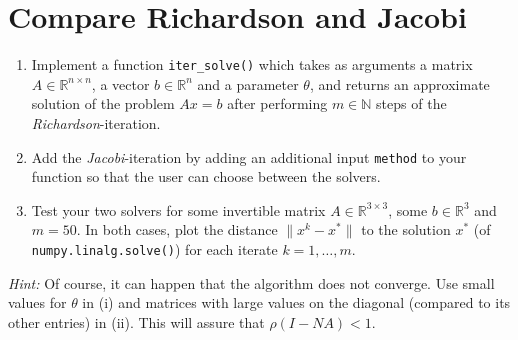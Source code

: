 \section{Compare Richardson and Jacobi}
\vspace{-0.5cm}
	\begin{enumerate}
		\item 	Implement a function \verb|iter_solve()| which takes as arguments a matrix $A \in \mathbb{R}^{n \times n}$, a vector $b \in \mathbb{R}^ {n}$ and a parameter $\theta$,
		and returns an approximate solution of the problem $Ax = b$ after performing $m \in \mathbb{N}$ steps of the \textit{Richardson}-iteration.
		\item Add the \textit{Jacobi}-iteration by adding an additional input \verb|method| to your function so that the user can choose between the solvers.
		\item Test your two solvers for some invertible matrix $A\in \mathbb{R}^{3 \times 3}$, some $b\in \mathbb{R}^3$ and $m = 50$. In both cases, plot the distance $\| x^k - x^*\|$ to the solution $x^*$ (of \verb|numpy.linalg.solve()|) for each iterate $k=1,\dots,m$.
	\end{enumerate}
	\textit{Hint: } Of course, it can happen that the algorithm does not converge. Use small values for $\theta$ in (i) and matrices with large values
	on the diagonal (compared to its other entries) in (ii). This will assure that $\rho(I-NA)<1$. 
